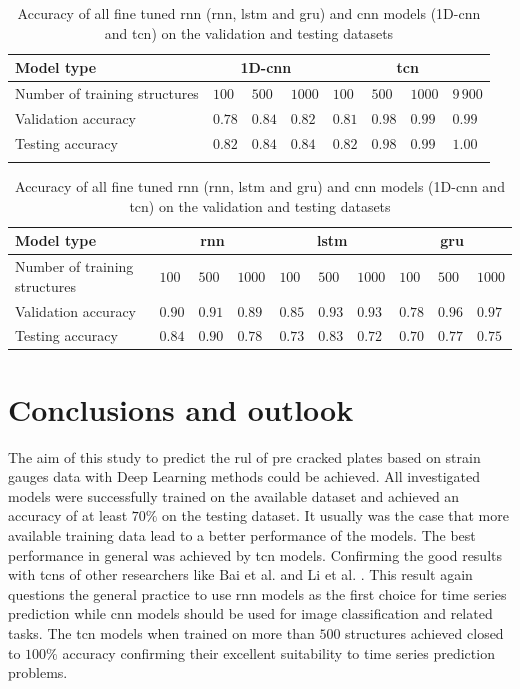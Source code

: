 \documentclass[conference]{IEEEtran}
\begin{document}
\begin{table}[htp]
	\centering
	\caption{Accuracy of all fine tuned \gls{rnn} (\gls{rnn}, \gls{lstm} and \gls{gru}) and \gls{cnn} models (1D-\gls{cnn} and \gls{tcn}) on the validation and testing datasets}
	\label{tab:accuracy_testing_rnn_cnn}
	\setlength{\tabcolsep}{3pt} %
	\begin{tabular}{p{2.5cm}|lll|llll}
		Model type & \multicolumn{3}{c|}{1D-\gls{cnn}} & \multicolumn{4}{c}{\gls{tcn}} \\
		\hline
		Number of training structures & $ 100 $ & $ 500 $ & $ 1000 $ & $ 100 $ & $ 500 $ & $ 1000 $ & $ 9\,900 $ \\
		Validation accuracy & $ 0.78 $ & $ 0.84 $ & $ 0.82 $ & $ 0.81 $ & $ 0.98 $ & $ 0.99 $ & $ 0.99 $ \\
		Testing accuracy & $ 0.82 $ & $ 0.84 $ & $ 0.84 $ & $ 0.82 $ & $ 0.98 $ & $ 0.99 $ & $ 1.00 $ \\
		\multicolumn{8}{c}{}
	\end{tabular}

	\setlength{\tabcolsep}{2pt} %
	\begin{tabular}{p{2.5cm}|lll|lll|lll}
		Model type & \multicolumn{3}{c|}{\gls{rnn}} & \multicolumn{3}{c|}{\gls{lstm}} &  \multicolumn{3}{c}{\gls{gru}}\\
		\hline
		Number of training structures & $ 100 $ & $ 500 $ & $ 1000 $ & $ 100 $ & $ 500 $ & $ 1000 $ & $ 100 $ & $ 500 $ & $ 1000 $ \\
		Validation accuracy & $ 0.90 $ & $ 0.91 $ & $ 0.89 $ & $ 0.85 $ & $ 0.93 $ & $ 0.93 $ & $ 0.78 $ & $ 0.96 $ & $ 0.97 $ \\
		Testing accuracy & $ 0.84 $ & $ 0.90 $ & $ 0.78 $ & $ 0.73 $ & $ 0.83 $ & $ 0.72 $ & $ 0.70 $ & $ 0.77 $ & $ 0.75 $
	\end{tabular}

\end{table}

\section{Conclusions and outlook}
\label{sec:conclusions_outlook}

The aim of this study to predict the \gls{rul} of pre cracked plates based on strain gauges data with Deep Learning methods could be achieved. All investigated models were successfully trained on the available dataset and achieved an accuracy of at least $ 70 \% $ on the testing dataset. It usually was the case that more available training data lead to a better performance of the models. The best performance in general was achieved by \gls{tcn} models. Confirming the good results with \glspl{tcn} of other researchers like Bai et al. \cite{Bai2018} and Li et al. \cite{Li2018}. This result again questions the general practice to use \gls{rnn} models as the first choice for time series prediction while \gls{cnn} models should be used for image classification and related tasks. The \gls{tcn} models when trained on more than $ 500 $ structures achieved closed to $ 100 \% $ accuracy confirming their excellent suitability to time series prediction problems.
\end{document}
